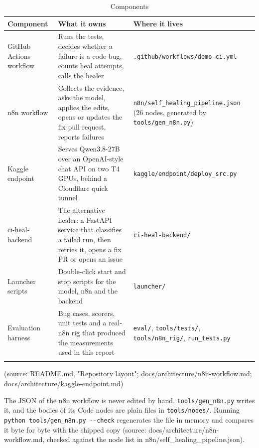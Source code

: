 \begingroup\small
\begin{longtable}{>{\raggedright\arraybackslash}p{0.223\dimexpr\linewidth-6\tabcolsep\relax}>{\raggedright\arraybackslash}p{0.345\dimexpr\linewidth-6\tabcolsep\relax}>{\raggedright\arraybackslash}p{0.432\dimexpr\linewidth-6\tabcolsep\relax}}
\toprule
\rowcolor{gray!14}\textbf{Component} & \textbf{What it owns} & \textbf{Where it lives} \\
\midrule
\endhead
\bottomrule
\endfoot
\endlastfoot
GitHub Actions workflow & Runs the tests, decides whether a failure is a code bug, counts heal attempts, calls the healer & \texttt{.\allowbreak{}github/\allowbreak{}workflows/\allowbreak{}demo-\allowbreak{}ci.\allowbreak{}yml} \\
n8n workflow & Collects the evidence, asks the model, applies the edits, opens or updates the fix pull request, reports failures & \texttt{n8n/\allowbreak{}self\_\allowbreak{}healing\_\allowbreak{}pipeline.\allowbreak{}json} (26 nodes, generated by \texttt{tools/\allowbreak{}gen\_\allowbreak{}n8n.\allowbreak{}py}) \\
Kaggle endpoint & Serves Qwen3.8-27B over an OpenAI-style chat API on two T4 GPUs, behind a Cloudflare quick tunnel & \texttt{kaggle/\allowbreak{}endpoint/\allowbreak{}deploy\_\allowbreak{}src.\allowbreak{}py} \\
ci-heal-backend & The alternative healer: a FastAPI service that classifies a failed run, then retries it, opens a fix PR or opens an issue & \texttt{ci-\allowbreak{}heal-\allowbreak{}backend/\allowbreak{}} \\
Launcher scripts & Double-click start and stop scripts for the model, n8n and the backend & \texttt{launcher/\allowbreak{}} \\
Evaluation harness & Bug cases, scorers, unit tests and a real-n8n rig that produced the measurements used in this report & \texttt{eval/\allowbreak{}}, \texttt{tools/\allowbreak{}tests/\allowbreak{}}, \texttt{tools/\allowbreak{}n8n\_\allowbreak{}rig/\allowbreak{}}, \texttt{run\_\allowbreak{}tests.\allowbreak{}py} \\
\bottomrule
\caption{Components}\label{tab:04-1}\\
\end{longtable}
\endgroup

(source: README.md, "Repository layout"; docs/\allowbreak{}architecture/\allowbreak{}n8n-workflow.md; docs/\allowbreak{}architecture/\allowbreak{}kaggle-endpoint.md)

The JSON of the n8n workflow is never edited by hand. \texttt{tools/\allowbreak{}gen\_\allowbreak{}n8n.\allowbreak{}py} writes it, and the bodies of its Code nodes are plain files in \texttt{tools/\allowbreak{}nodes/\allowbreak{}}. Running \texttt{python tools/\allowbreak{}gen\_\allowbreak{}n8n.\allowbreak{}py -\allowbreak{}-\allowbreak{}check} regenerates the file in memory and compares it byte for byte with the shipped copy (source: docs/\allowbreak{}architecture/\allowbreak{}n8n-workflow.md, checked against the node list in n8n/\allowbreak{}self\_\allowbreak{}healing\_\allowbreak{}pipeline.json).

